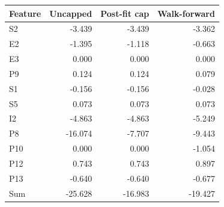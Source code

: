 \begin{tabular}{lrrr}
\toprule
Feature & Uncapped & Post-fit cap & Walk-forward \\
\midrule
S2 & -3.439 & -3.439 & -3.362 \\
E2 & -1.395 & -1.118 & -0.663 \\
E3 & 0.000 & 0.000 & 0.000 \\
P9 & 0.124 & 0.124 & 0.079 \\
S1 & -0.156 & -0.156 & -0.028 \\
S5 & 0.073 & 0.073 & 0.073 \\
I2 & -4.863 & -4.863 & -5.249 \\
P8 & -16.074 & -7.707 & -9.443 \\
P10 & 0.000 & 0.000 & -1.054 \\
P12 & 0.743 & 0.743 & 0.897 \\
P13 & -0.640 & -0.640 & -0.677 \\
Sum & -25.628 & -16.983 & -19.427 \\
\bottomrule
\end{tabular}
